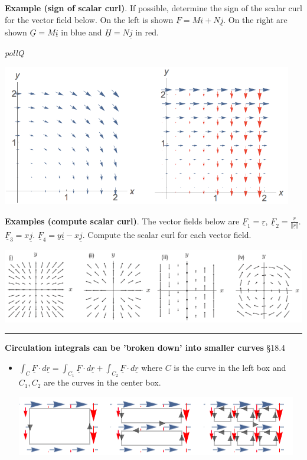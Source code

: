 \documentclass[12pt,letterpaper,noanswers]{exam}
\newcommand{\mb}[1]{\underline{#1}}
\begin{document}
\noindent\textbf{Example (sign of scalar curl)}.  If possible, determine the sign of the scalar curl for the vector field below.  On the left is shown $\mb F = M\mb i + N\mb j$.  On the right are shown $\mb G = M\mb i$ in blue and $\mb H = N\mb j$ in red.

\emph{pollQ}

\includegraphics[width=5in]{img/C28p5.png}

\eject

\noindent\textbf{Examples (compute scalar curl)}. 
The vector fields below are
$\mb F_1 = \mb r$, $\mb F_{2} = \frac{\mb r}{\Vert \mb r\Vert}$.  $\mb F_{3} = x\mb j$.  $\mb F_{4} = y\mb i - x\mb j.$  Compute the scalar curl for each vector field.


\includegraphics[width=\linewidth]{img/C23p1.png}
\vspace{1.5in}



\vspace{0.2cm}
\hrule
\vspace{0.2cm}

\noindent\textbf{Circulation integrals can be 'broken down' into smaller curves} \S 18.4
\begin{tcolorbox}
\begin{itemize}
\itemsep0em
\item $\int_C \mb F \cdot d\mb r = \int_{C_1} \mb F \cdot d\mb r + \int_{C_2} \mb F \cdot d\mb r$ where $C$ is the curve in the left box and $C_1, C_2$ are the curves in the center box.
\begin{center}
\includegraphics[width=\linewidth]{img/C24p1-21.png}
\end{center}
\end{itemize}
\end{tcolorbox}
\end{document}
